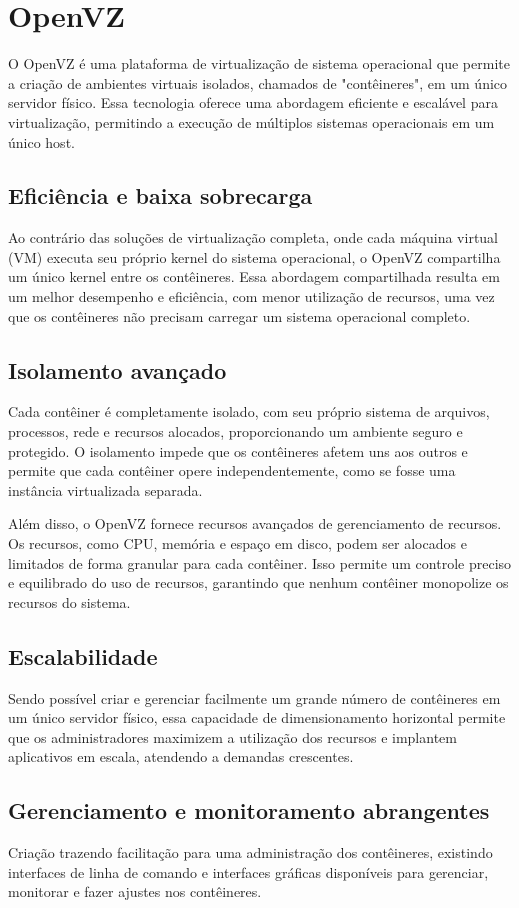 \section{OpenVZ}

O OpenVZ é uma plataforma de virtualização de sistema operacional que permite a criação de ambientes virtuais isolados, chamados de "contêineres", em um único servidor físico. Essa tecnologia oferece uma abordagem eficiente e escalável para virtualização, permitindo a execução de múltiplos sistemas operacionais em um único host.

\subsection{Eficiência e baixa sobrecarga}
 Ao contrário das soluções de virtualização completa, onde cada máquina virtual (VM) executa seu próprio kernel do sistema operacional, o OpenVZ compartilha um único kernel entre os contêineres. Essa abordagem compartilhada resulta em um melhor desempenho e eficiência, com menor utilização de recursos, uma vez que os contêineres não precisam carregar um sistema operacional completo.

\subsection{Isolamento avançado}
Cada contêiner é completamente isolado, com seu próprio sistema de arquivos, processos, rede e recursos alocados, proporcionando um ambiente seguro e protegido. O isolamento impede que os contêineres afetem uns aos outros e permite que cada contêiner opere independentemente, como se fosse uma instância virtualizada separada.

Além disso, o OpenVZ fornece recursos avançados de gerenciamento de recursos. Os recursos, como CPU, memória e espaço em disco, podem ser alocados e limitados de forma granular para cada contêiner. Isso permite um controle preciso e equilibrado do uso de recursos, garantindo que nenhum contêiner monopolize os recursos do sistema.

\subsection{Escalabilidade}
Sendo possível criar e gerenciar facilmente um grande número de contêineres em um único servidor físico, essa capacidade de dimensionamento horizontal permite que os administradores maximizem a utilização dos recursos e implantem aplicativos em escala, atendendo a demandas crescentes.

\subsection{Gerenciamento e monitoramento abrangentes}
 Criação trazendo  facilitação para uma administração dos contêineres, existindo interfaces de linha de comando e interfaces gráficas disponíveis para gerenciar, monitorar e fazer ajustes nos contêineres.